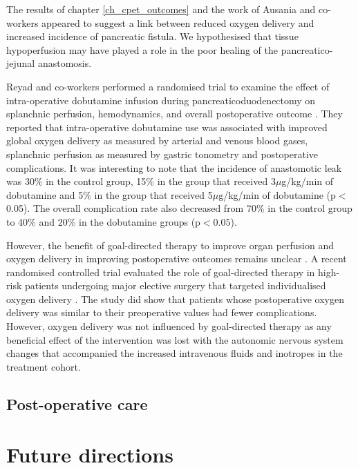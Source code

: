 The results of chapter \ref{ch_cpet_outcomes} and the work of Ausania and co-workers appeared to suggest a link between reduced oxygen delivery and increased incidence of pancreatic fistula. 
We hypothesised that tissue hypoperfusion may have played a role in the poor healing of the pancreatico-jejunal anastomosis. 

Reyad and co-workers performed a randomised trial to examine the effect of intra-operative dobutamine infusion during pancreaticoduodenectomy on splanchnic perfusion, hemodynamics, and overall postoperative outcome \parencite{reyad_effect_2013}. 
They reported that intra-operative dobutamine use was associated with improved global oxygen delivery as measured by arterial and venous blood gases, splanchnic perfusion as measured by gastric tonometry and postoperative complications.
It was interesting to note that the incidence of anastomotic leak was 30\% in the control group, 15\% in the group that received 3$\mu$g/kg/min of dobutamine and 5\% in the group that received 5$\mu$g/kg/min of dobutamine (p$<$0.05). The overall complication rate also decreased from 70\% in the control group to 40\% and 20\% in the dobutamine groups (p$<0.05$).

However, the benefit of goal-directed therapy to improve organ perfusion and oxygen delivery in improving postoperative outcomes remains unclear \parencite{grocott_perioperative_2013, pearse_effect_2014}. 
A recent randomised controlled trial evaluated the role of goal-directed therapy in high-risk patients undergoing major elective surgery that targeted individualised oxygen delivery \parencite{ackland_individualised_2015}.
The study did show that patients whose postoperative oxygen delivery was similar to their preoperative values had fewer complications.
However, oxygen delivery was not influenced by goal-directed therapy as any beneficial effect of the intervention was lost with the autonomic nervous system changes that accompanied the increased intravenous fluids and inotropes in the treatment cohort.









\subsection{Post-operative care}


\section{Future directions}


